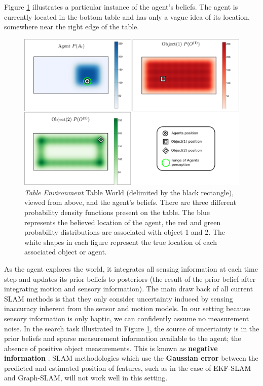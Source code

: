 Figure \ref{fig:Figure1} illustrates a particular instance of the agent's beliefs. 
The agent is currently located in the bottom  table and has only a vague idea of its location, somewhere near the right edge of the table. 

\begin{figure}
  \centering
  \includegraphics[width=0.95\linewidth]{./ch5-MLMF/Figures/Figure1.pdf}
  \caption{ \textit{Table Environment} Table World (delimited by the black rectangle), viewed from above, and the agent's beliefs. 
  There are three different probability density functions present on the table. 
  The blue represents the believed location of the agent, the red and green probability distributions are associated with object 1 and 2.
  The white shapes in each figure represent the true location of each associated object or agent.}
  \label{fig:Figure1}
\end{figure}
\vspace*{0.6cm}

As the agent explores the world, it integrates all sensing information at each time step and updates its prior beliefs to posteriors
(the result of the prior belief after integrating motion and sensory information).
The main draw back of all current SLAM methods is that they only consider uncertainty induced by sensing inaccuracy inherent from 
the sensor and motion models. In our setting because sensory information is only haptic, we can confidently assume no measurement noise. 
In the search task illustrated in Figure \ref{fig:Figure1}, the source of uncertainty is in the prior 
beliefs and sparse measurement information available to the agent; the absence of positive object measurements. 
This is known as \textbf{negative information} \cite[p.313]{Thrun_Burgard_Fox_2005} \cite{Thrun02particlefilters,negative_info_markov_localisation}. 
SLAM methodologies which use the \textbf{Gaussian error} between the predicted and estimated position of features, such as in the case 
of EKF-SLAM and Graph-SLAM, will not work well in this setting. 

